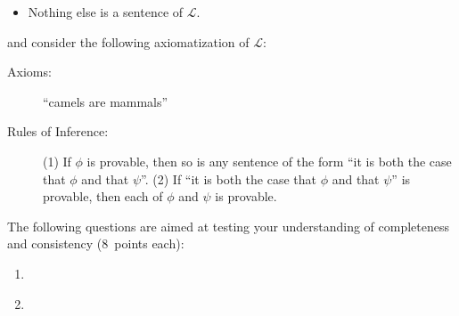 \documentclass[12pt,a4paper]{article}
\begin{document}
\begin{enumerate}
{\begin{itemize}
\item Nothing else is a sentence of $\mathcal{L}$.

\end{itemize}
and consider the following axiomatization of $\mathcal{L}$:

\begin{description}

\item[Axioms:] ``camels are mammals''

\item[Rules of Inference:] (1) If $\phi$ is provable, then so is any sentence of the form ``it is both the case that $\phi$  and that $\psi$''. (2) If ``it is both the case that $\phi$ and that $\psi$'' is provable, then each of $\phi$ and $\psi$ is provable.

\end{description}

}
The following questions are aimed at testing your understanding of completeness and consistency (8~points each):
\begin{enumerate}



\item {}




\item \label{axioms} 

\end{enumerate}
\end{enumerate}
\end{document}
